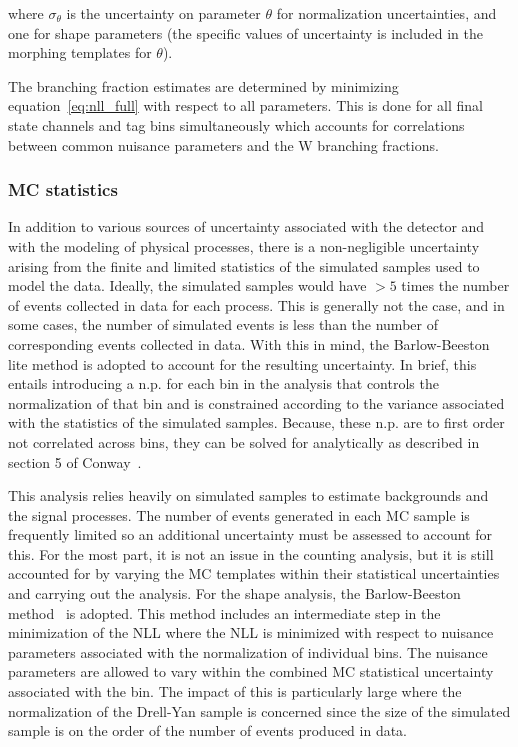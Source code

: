 where $\sigma_{\theta}$ is the uncertainty on parameter $\theta$ for
normalization uncertainties, and one for shape parameters (the specific
values of uncertainty is included in the morphing templates for
$\theta$).

The branching fraction estimates are determined by minimizing
equation~\ref{eq:nll_full} with respect to all parameters.  This is done
for all final state channels and \PQb tag bins simultaneously which
accounts for correlations between common nuisance parameters and the W
branching fractions.

\subsubsection{MC statistics}

In addition to various sources of uncertainty associated with the
detector and with the modeling of physical processes, there is a
non-negligible uncertainty arising from the finite and limited
statistics of the simulated samples used to model the data.  Ideally,
the simulated samples would have $>5$ times the number of events
collected in data for each process.  This is generally not the case, and
in some cases, the number of simulated events is less than the number of
corresponding events collected in data.  With this in mind, the
Barlow-Beeston lite method is adopted to account for the resulting
uncertainty.  In brief, this entails introducing a n.p. for each bin in
the analysis that controls the normalization of that bin and is
constrained according to the variance associated with the statistics
of the simulated samples.  Because, these n.p. are to first order not
correlated across bins, they can be solved for analytically as described
in section 5 of Conway~\cite{Conway:2011in}.

This analysis relies heavily on simulated samples to estimate
backgrounds and the signal processes.  The number of events generated in
each MC sample is frequently limited so an additional uncertainty must
be assessed to account for this.  For the most part, it is not an issue
in the counting analysis, but it is still accounted for by varying the
MC templates within their statistical uncertainties and carrying out the
analysis.  For the shape analysis, the Barlow-Beeston
method~\cite{Amsler:2008zzb} is adopted.  This method includes an
intermediate step in the minimization of the NLL where the NLL is
minimized with respect to nuisance parameters associated with the
normalization of individual bins.  The nuisance parameters are allowed
to vary within the combined MC statistical uncertainty associated with the
bin.  The impact of this is particularly large where the normalization
of the Drell-Yan sample is concerned since the size of the simulated
sample is on the order of the number of events produced in data.



